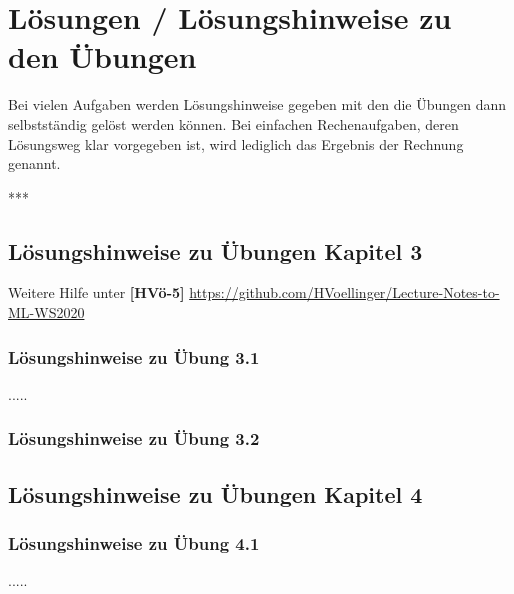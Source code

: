 \documentclass[12pt]{article}
\begin{document}
\section{Lösungen / Lösungshinweise zu den Übungen \\}

Bei vielen Aufgaben werden Lösungshinweise gegeben mit den die Übungen dann selbstständig gelöst werden können. Bei einfachen Rechenaufgaben, deren Lösungsweg klar vorgegeben ist, wird lediglich das Ergebnis der Rechnung genannt.\\
{\color{red}{*******************************************************************\\ ab hier bis Ende der Hinweise sind die Folien der Vorlesung ML  zu nutzen und diese sind in Latex umzusetzen\\
********************************************************************\\}}



***\\
\subsection{Lösungshinweise zu Übungen Kapitel 3}

\hspace*{-1.8cm} Weitere Hilfe unter \textbf{[HVö-5]} \url{https://github.com/HVoellinger/Lecture-Notes-to-ML-WS2020}\\


\subsubsection{Lösungshinweise zu Übung 3.1}


.....\\

\subsubsection{Lösungshinweise zu Übung 3.2} 


\newpage

\subsection{Lösungshinweise zu Übungen Kapitel 4}

\subsubsection{Lösungshinweise zu Übung 4.1}
.....\\
\end{document}
